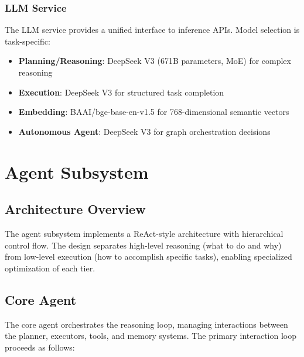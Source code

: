 \documentclass[11pt,a4paper]{article}
\begin{document}
\subsubsection{LLM Service}

The LLM service provides a unified interface to inference APIs. Model selection is task-specific:
\begin{itemize}
    \item \textbf{Planning/Reasoning}: DeepSeek V3 (671B parameters, MoE) for complex reasoning
    \item \textbf{Execution}: DeepSeek V3 for structured task completion
    \item \textbf{Embedding}: BAAI/bge-base-en-v1.5 for 768-dimensional semantic vectors
    \item \textbf{Autonomous Agent}: DeepSeek V3 for graph orchestration decisions
\end{itemize}

\section{Agent Subsystem}
\label{sec:agent}

\subsection{Architecture Overview}

The agent subsystem implements a ReAct-style \citep{yao2022react} architecture with hierarchical control flow. The design separates high-level reasoning (what to do and why) from low-level execution (how to accomplish specific tasks), enabling specialized optimization of each tier.

\subsection{Core Agent}

The core agent orchestrates the reasoning loop, managing interactions between the planner, executors, tools, and memory systems. The primary interaction loop proceeds as follows:
\end{document}

